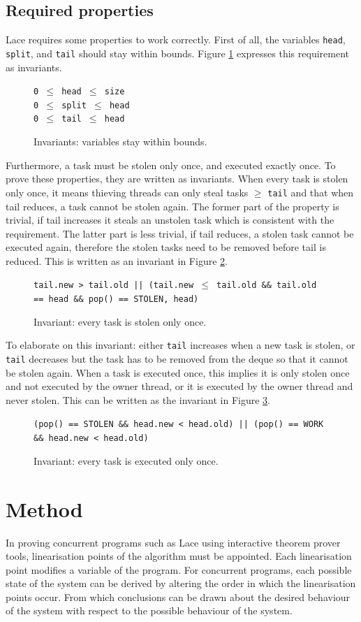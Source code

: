 \documentclass{sig-alternate-br}
\begin{document}
\subsection{Required properties}
Lace requires some properties to work correctly.
First of all, the variables \texttt{head}, \texttt{split}, and \texttt{tail} should stay within bounds.
Figure \ref{inv:bounds} expresses this requirement as invariants. 
\begin{figure}[h]
	\texttt{0 $\leq$ head $\leq$ size}\\
	\texttt{0 $\leq$ split $\leq$ head}\\
	\texttt{0 $\leq$ tail $\leq$ head}
	\caption{Invariants: variables stay within bounds.}
	\label{inv:bounds}
\end{figure}
Furthermore, a task must be stolen only once, and executed exactly once.
To prove these properties, they are written as invariants.
When every task is stolen only once, it means thieving threads can only steal tasks $\geq$ \texttt{tail} and that when tail reduces, a task cannot be stolen again. The former part of the property is trivial, if tail increases it steals an unstolen task which is consistent with the requirement. The latter part is less trivial, if tail reduces, a stolen task cannot be executed again, therefore the stolen tasks need to be removed before tail is reduced. This is written as an invariant in Figure \ref{inv:stolen}.
\begin{figure}[h]
	\texttt{tail.new > tail.old || (tail.new $\leq$ tail.old \&\& tail.old == head \&\& pop() == STOLEN, head)}
	\caption{Invariant: every task is stolen only once.}
	\label{inv:stolen}
\end{figure}
To elaborate on this invariant: either \texttt{tail} increases when a new task is stolen, or \texttt{tail} decreases but the task has to be removed from the deque so that it cannot be stolen again.
When a task is executed once, this implies it is only stolen once and not executed by the owner thread, or it is executed by the owner thread and never stolen. This can be written as the invariant in Figure \ref{inv:exec}.
\begin{figure}[h]
	\texttt{(pop() == STOLEN \&\& head.new < head.old) || (pop() == WORK \&\& head.new < head.old)}
	\caption{Invariant: every task is executed only once.}
	\label{inv:exec}
\end{figure}

\section{Method}
In proving concurrent programs such as Lace using interactive theorem prover tools, linearisation points of the algorithm must be appointed.
Each linearisation point modifies a variable of the program.
For concurrent programs, each possible state of the system can be derived by altering the order in which the linearisation points occur.
From which conclusions can be drawn about the desired behaviour of the system with respect to the possible behaviour of the system.
\end{document}
